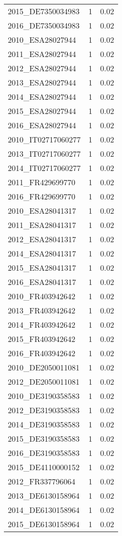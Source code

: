 \begin{table*}[htbp]
\begin{tabular}{lrr}
2015_DE7350034983 & 1 & 0.02 \\
2016_DE7350034983 & 1 & 0.02 \\
2010_ESA28027944 & 1 & 0.02 \\
2011_ESA28027944 & 1 & 0.02 \\
2012_ESA28027944 & 1 & 0.02 \\
2013_ESA28027944 & 1 & 0.02 \\
2014_ESA28027944 & 1 & 0.02 \\
2015_ESA28027944 & 1 & 0.02 \\
2016_ESA28027944 & 1 & 0.02 \\
2010_IT02717060277 & 1 & 0.02 \\
2013_IT02717060277 & 1 & 0.02 \\
2014_IT02717060277 & 1 & 0.02 \\
2011_FR429699770 & 1 & 0.02 \\
2016_FR429699770 & 1 & 0.02 \\
2010_ESA28041317 & 1 & 0.02 \\
2011_ESA28041317 & 1 & 0.02 \\
2012_ESA28041317 & 1 & 0.02 \\
2014_ESA28041317 & 1 & 0.02 \\
2015_ESA28041317 & 1 & 0.02 \\
2016_ESA28041317 & 1 & 0.02 \\
2010_FR403942642 & 1 & 0.02 \\
2013_FR403942642 & 1 & 0.02 \\
2014_FR403942642 & 1 & 0.02 \\
2015_FR403942642 & 1 & 0.02 \\
2016_FR403942642 & 1 & 0.02 \\
2010_DE2050011081 & 1 & 0.02 \\
2012_DE2050011081 & 1 & 0.02 \\
2010_DE3190358583 & 1 & 0.02 \\
2012_DE3190358583 & 1 & 0.02 \\
2014_DE3190358583 & 1 & 0.02 \\
2015_DE3190358583 & 1 & 0.02 \\
2016_DE3190358583 & 1 & 0.02 \\
2015_DE4110000152 & 1 & 0.02 \\
2012_FR337796064 & 1 & 0.02 \\
2013_DE6130158964 & 1 & 0.02 \\
2014_DE6130158964 & 1 & 0.02 \\
2015_DE6130158964 & 1 & 0.02 \\

\end{tabular}
\end{table*}
